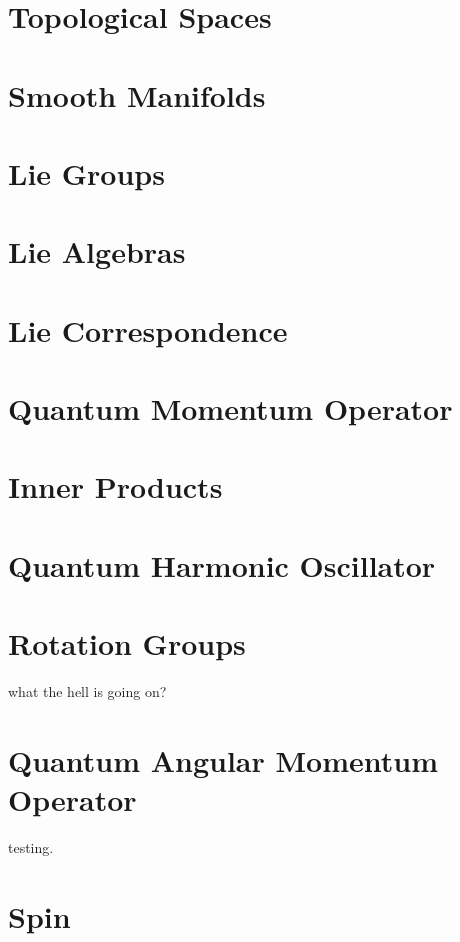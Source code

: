 \documentclass[12pt]{article}
\theoremstyle{definition}
\theoremstyle{remark}
\theoremstyle{example}
\begin{document}
\section{Topological Spaces}

\section{Smooth Manifolds}

\section{Lie Groups}

\section{Lie Algebras}

\section{Lie Correspondence}

\section{Quantum Momentum Operator}

\section{Inner Products}

\section{Quantum Harmonic Oscillator}

\section{Rotation Groups}

what the hell is going on?

\section{Quantum Angular Momentum Operator}

testing.

\section{Spin}
\end{document}
